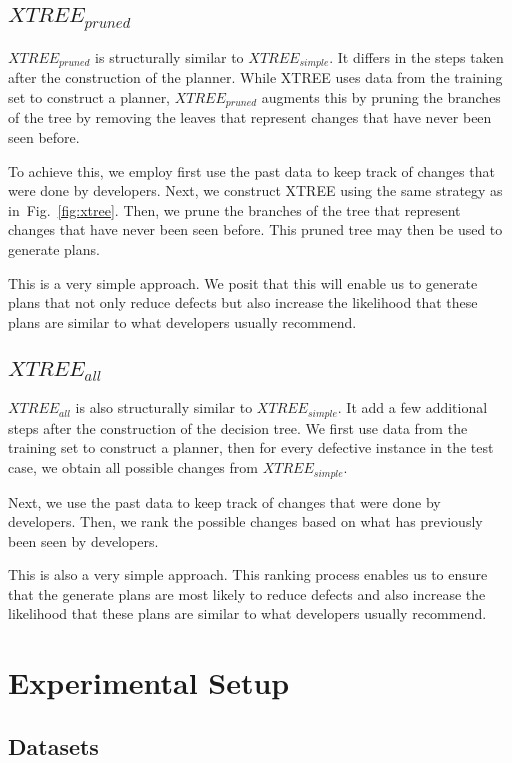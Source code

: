 \documentclass[sigconf, proceedings, 9pt]{acmart}
\newcommand{\fig}[1]{Fig.~\ref{fig:#1}}
\begin{document}
\subsection{$XTREE_{pruned}$}
$XTREE_{pruned}$ is structurally similar to $XTREE_{simple}$. It differs in the 
steps taken after the construction of the planner. While XTREE uses data from 
the training set to construct a planner, $XTREE_{pruned}$ augments this by 
pruning the branches of the tree by removing the leaves that represent changes 
that have never been seen before. 

To achieve this, we employ first use the past data to keep track of changes 
that were done by developers. Next, we construct XTREE using the same strategy 
as in~\fig{xtree}.  Then, we prune the branches of the tree that represent 
changes that have never been seen before. This pruned tree may then be used to 
generate plans. 

This is a very simple approach. We posit that this will enable us to generate 
plans that not only reduce defects but also increase the likelihood that these 
plans are similar to what developers usually recommend.

\subsection{$XTREE_{all}$}
$XTREE_{all}$ is also structurally similar to $XTREE_{simple}$. It add a few 
additional steps after the construction of the decision tree. We first use data 
from the training set to construct a planner, then for every defective instance 
in the test case, we obtain all possible changes from $XTREE_{simple}$.

Next, we use the past data to keep track of changes that were done by 
developers. Then, we rank the possible changes based on what has previously 
been seen by developers. 

This is also a very simple approach. This ranking process enables us to ensure 
that the generate plans are most likely to reduce defects and also increase the 
likelihood that these plans are similar to what developers usually recommend.

\section{Experimental Setup}
\label{sect:expt}

\subsection{Datasets} 
\label{sect:datasets}



\end{document}
